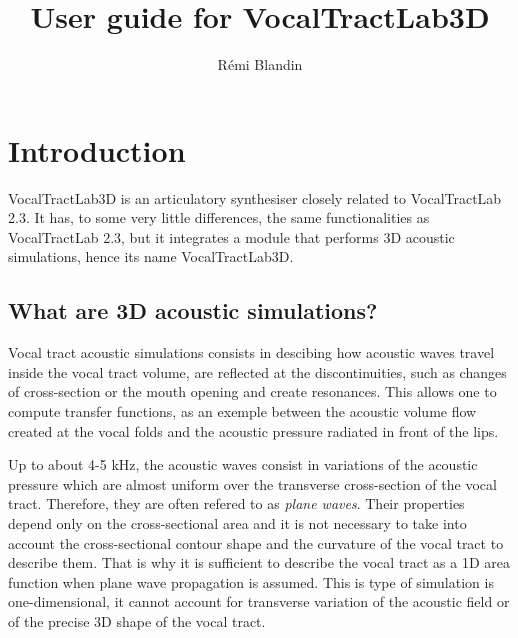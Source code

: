 \documentclass[]{article}
\title{User guide for VocalTractLab3D}
\author{R{\'e}mi Blandin}
\begin{document}
	\maketitle
	
	\section{Introduction}
	
	VocalTractLab3D is an articulatory synthesiser closely related to VocalTractLab 2.3. It has, to some very little differences, the same functionalities as 
	VocalTractLab 2.3, but it integrates a module that performs 3D acoustic 
	simulations, hence its name VocalTractLab3D.
	
	\subsection{What are 3D acoustic simulations?}
	
	Vocal tract acoustic simulations consists in descibing how acoustic waves travel
	inside the vocal tract volume, are reflected at the discontinuities, such as 
	changes of cross-section or the mouth opening and create resonances. 
	This allows one to compute transfer functions, as an exemple between the acoustic volume flow created at the vocal folds and the acoustic pressure radiated in front of the lips.
	
	Up to about 4-5 kHz, the acoustic waves consist in variations of the acoustic 
	pressure which are almost uniform over the transverse cross-section of the vocal tract. Therefore, they are often refered to as \emph{plane waves}.
	Their properties depend only on the cross-sectional area and it is not necessary to take into account the cross-sectional contour shape and the curvature of the vocal tract to describe them. 
	That is why it is sufficient to describe the vocal tract as a 1D area function 
	when plane wave propagation is assumed. 
	This is type of simulation is one-dimensional, it cannot account for transverse 
	variation of the acoustic field or of the precise 3D shape of the vocal tract.
\end{document}
